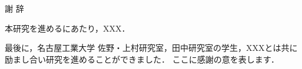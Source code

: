 \setcounter{chapter}{7}
\chapter*{}
\thispagestyle{myheadings}

\vspace*{-2cm}
\begin{center}
{\Large 謝 辞}
\end{center}
\vspace{1.0cm}


本研究を進めるにあたり，XXX．

最後に，名古屋工業大学 佐野・上村研究室，田中研究室の学生，XXXとは共に励まし合い研究を進めることができました．
ここに感謝の意を表します．
